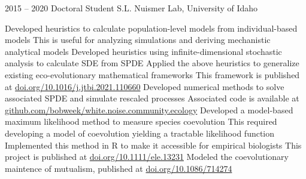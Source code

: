 \documentclass[9pt]{developercv} %
\begin{document}
\begin{entrylist}
        \entry
        {2015 -- 2020}
        {Doctoral Student}
        {S.L. Nuismer Lab, University of Idaho}
        {\vspace{-10 pt}\begin{outline}[itemize]
            \1 Developed heuristics to calculate population-level models from individual-based models
                \vspace{-6 pt}\2[$\cdot$] This is useful for analyzing simulations and deriving mechanistic analytical models
            \vspace{-6 pt}\1 Developed heuristics using infinite-dimensional stochastic analysis to calculate SDE from SPDE
            \vspace{-6 pt}\1 Applied the above heuristics to generalize existing eco-evolutionary mathematical frameworks
                \vspace{-6 pt}\2[$\cdot$] This framework is published at \href{https://doi.org/10.1016/j.jtbi.2021.110660}{\footnotesize{doi.org/10.1016/j.jtbi.2021.110660}}
            \vspace{-6 pt}\1 Developed numerical methods to solve associated SPDE and simulate rescaled processes
                \vspace{-6 pt}\2[$\cdot$] Associated code is available at \href{https://github.com/bobweek/white.noise.community.ecology}{\footnotesize{github.com/bobweek/white.noise.community.ecology}}
            \vspace{-6 pt} \1 Developed a model-based maximum likelihood method to measure species coevolution
                \vspace{-6 pt}\2[$\cdot$] This required developing a model of coevolution yielding a tractable likelihood function
                \vspace{-3 pt}\2[$\cdot$] Implemented this method in R to make it accessible for empirical biologists
                \vspace{-3 pt}\2[$\cdot$] This project is published at \href{https://doi.org/10.1111/ele.13231}{\footnotesize{doi.org/10.1111/ele.13231}}
            \vspace{-6 pt} \1 Modeled the coevolutionary maintence of mutualism, published at \href{https://doi.org/10.1086/714274}{\footnotesize{doi.org/10.1086/714274}}
        \end{outline}}
\end{entrylist}
\end{document}
